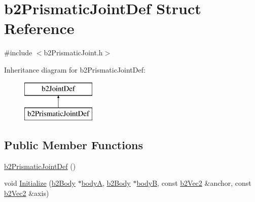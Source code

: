 \hypertarget{structb2_prismatic_joint_def}{}\section{b2\+Prismatic\+Joint\+Def Struct Reference}
\label{structb2_prismatic_joint_def}


{\ttfamily \#include $<$b2\+Prismatic\+Joint.\+h$>$}

Inheritance diagram for b2\+Prismatic\+Joint\+Def\+:\begin{figure}[H]
\begin{center}
\leavevmode
\includegraphics[height=2.000000cm]{structb2_prismatic_joint_def}
\end{center}
\end{figure}
\subsection*{Public Member Functions}
\begin{DoxyCompactItemize}
\item 
\mbox{\hyperlink{structb2_prismatic_joint_def_aed2cd56b9d870058413f9bd33ee915b9}{b2\+Prismatic\+Joint\+Def}} ()
\item 
void \mbox{\hyperlink{structb2_prismatic_joint_def_ae60043bc22b077e8c59ab248dc34652f}{Initialize}} (\mbox{\hyperlink{classb2_body}{b2\+Body}} $\ast$\mbox{\hyperlink{structb2_joint_def_a8cd54c93da396be75a9788f2c6897f05}{bodyA}}, \mbox{\hyperlink{classb2_body}{b2\+Body}} $\ast$\mbox{\hyperlink{structb2_joint_def_aa4f4dee2fbcd12187b19506b60e68e3d}{bodyB}}, const \mbox{\hyperlink{structb2_vec2}{b2\+Vec2}} \&anchor, const \mbox{\hyperlink{structb2_vec2}{b2\+Vec2}} \&axis)
\end{DoxyCompactItemize}
